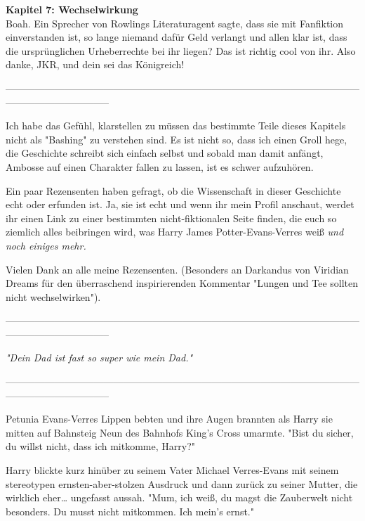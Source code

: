

\hypertarget{wechselwirkung}{%

\textbf{Kapitel 7: Wechselwirkung}\\

Boah. Ein Sprecher von Rowlings Literaturagent sagte, dass sie mit Fanfiktion einverstanden ist, so lange niemand dafür Geld verlangt und allen klar ist, dass die ursprünglichen Urheberrechte bei ihr liegen? Das ist richtig cool von ihr. Also danke, JKR, und dein sei das Königreich!

--------------------------------------------------------------------------------------------------------------------------------------------

Ich habe das Gefühl, klarstellen zu müssen das bestimmte Teile dieses Kapitels nicht als "Bashing" zu verstehen sind. Es ist nicht so, dass ich einen Groll hege, die Geschichte schreibt sich einfach selbst und sobald man damit anfängt, Ambosse auf einen Charakter fallen zu lassen, ist es schwer aufzuhören.

Ein paar Rezensenten haben gefragt, ob die Wissenschaft in dieser Geschichte echt oder erfunden ist. Ja, sie ist echt und wenn ihr mein Profil anschaut, werdet ihr einen Link zu einer bestimmten nicht-fiktionalen Seite finden, die euch so ziemlich alles beibringen wird, was Harry James Potter-Evans-Verres weiß \emph{und noch einiges mehr.}

Vielen Dank an alle meine Rezensenten. (Besonders an Darkandus von Viridian Dreams für den überraschend inspirierenden Kommentar "Lungen und Tee sollten nicht wechselwirken").

--------------------------------------------------------------------------------------------------------------------------------------------

\emph{"Dein Dad ist fast so super wie mein Dad."}

--------------------------------------------------------------------------------------------------------------------------------------------

Petunia Evans-Verres Lippen bebten und ihre Augen brannten als Harry sie mitten auf Bahnsteig Neun des Bahnhofs King's Cross umarmte. "Bist du sicher, du willst nicht, dass ich mitkomme, Harry?"

Harry blickte kurz hinüber zu seinem Vater Michael Verres-Evans mit seinem stereotypen ernsten-aber-stolzen Ausdruck und dann zurück zu seiner Mutter, die wirklich eher… ungefasst aussah. "Mum, ich weiß, du magst die Zauberwelt nicht besonders. Du musst nicht mitkommen. Ich mein's ernst."

}
